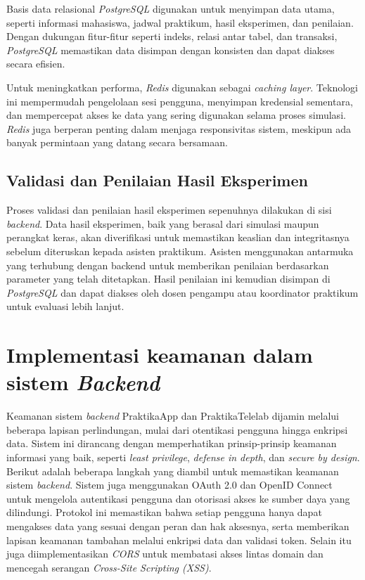 Basis data relasional \emph{PostgreSQL} digunakan untuk menyimpan data utama, seperti informasi mahasiswa, jadwal praktikum, hasil eksperimen, dan penilaian. Dengan dukungan fitur-fitur seperti indeks, relasi antar tabel, dan transaksi, \emph{PostgreSQL} memastikan data disimpan dengan konsisten dan dapat diakses secara efisien.

Untuk meningkatkan performa, \emph{Redis} digunakan sebagai \emph{caching layer}. Teknologi ini mempermudah pengelolaan sesi pengguna, menyimpan kredensial sementara, dan mempercepat akses ke data yang sering digunakan selama proses simulasi. \emph{Redis} juga berperan penting dalam menjaga responsivitas sistem, meskipun ada banyak permintaan yang datang secara bersamaan.

\subsection{Validasi dan Penilaian Hasil Eksperimen}
Proses validasi dan penilaian hasil eksperimen sepenuhnya dilakukan di sisi \emph{backend}. Data hasil eksperimen, baik yang berasal dari simulasi maupun perangkat keras, akan diverifikasi untuk memastikan keaslian dan integritasnya sebelum diteruskan kepada asisten praktikum. Asisten menggunakan antarmuka yang terhubung dengan backend untuk memberikan penilaian berdasarkan parameter yang telah ditetapkan. Hasil penilaian ini kemudian disimpan di \emph{PostgreSQL} dan dapat diakses oleh dosen pengampu atau koordinator praktikum untuk evaluasi lebih lanjut.


\section{Implementasi keamanan dalam sistem \emph{Backend}}
Keamanan sistem \emph{backend} PraktikaApp dan PraktikaTelelab dijamin melalui beberapa lapisan perlindungan, mulai dari otentikasi pengguna hingga enkripsi data. Sistem ini dirancang dengan memperhatikan prinsip-prinsip keamanan informasi yang baik, seperti \emph{least privilege}, \emph{defense in depth}, dan \emph{secure by design}. Berikut adalah beberapa langkah yang diambil untuk memastikan keamanan sistem \emph{backend}. Sistem juga menggunakan OAuth 2.0 dan OpenID Connect untuk mengelola autentikasi pengguna dan otorisasi akses ke sumber daya yang dilindungi. Protokol ini memastikan bahwa setiap pengguna hanya dapat mengakses data yang sesuai dengan peran dan hak aksesnya, serta memberikan lapisan keamanan tambahan melalui enkripsi data dan validasi token. Selain itu juga diimplementasikan \emph{CORS} untuk membatasi akses lintas domain dan mencegah serangan \emph{Cross-Site Scripting (XSS)}.

